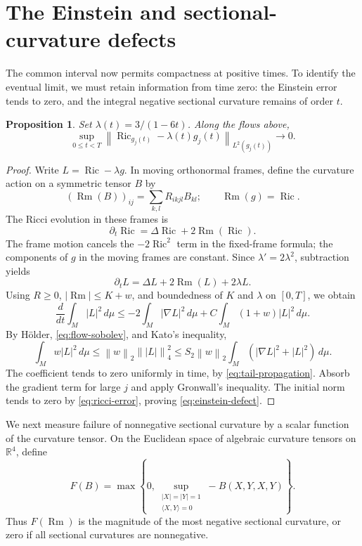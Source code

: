 \documentclass[11pt]{article}
\newtheorem{proposition}[theorem]{Proposition}
\theoremstyle{definition}
\theoremstyle{remark}
\numberwithin{equation}{section}
\DeclareMathOperator{\Ric}{Ric}
\DeclareMathOperator{\Rm}{Rm}
\newcommand{\dd}{\,d\mu}
\newcommand{\R}{\mathbb R}
\newcommand{\norm}[1]{\left\lVert #1\right\rVert}
\begin{document}
\section{The Einstein and sectional-curvature defects}
\label{sec:defects}

The common interval now permits compactness at positive times. To
identify the eventual limit, we must retain information from time zero:
the Einstein error tends to zero, and the integral negative sectional
curvature remains of order $t$.

\begin{proposition}\label{prop:einstein-defect}
Set $\lambda(t)=3/(1-6t)$. Along the flows above,
\begin{equation}\label{eq:einstein-defect}
 \sup_{0\le t<T}
 \norm{\Ric_{g_j(t)}-\lambda(t)g_j(t)}_{L^2(g_j(t))}
 \longrightarrow0.
\end{equation}
\end{proposition}

\begin{proof}
Write $L=\Ric-\lambda g$. In moving orthonormal frames, define the
curvature action on a symmetric tensor $B$ by
\[
 (\Rm(B))_{ij}=\sum_{k,l}R_{ikjl}B_{kl};
 \qquad \Rm(g)=\Ric.
\]
The Ricci evolution in these frames is
\[
 \partial_t\Ric=\Delta\Ric+2\Rm(\Ric).
\]
The frame motion cancels the $-2\Ric^2$ term in the fixed-frame formula;
the components of $g$ in the moving frames are constant. Since
$\lambda'=2\lambda^2$, subtraction yields
\begin{equation}\label{eq:L-flow}
 \partial_tL=\Delta L+2\Rm(L)+2\lambda L.
\end{equation}
Using $R\ge0$, $|\Rm|\le K+w$, and boundedness of $K$ and $\lambda$
on $[0,T]$, we obtain
\[
 \frac d{dt}\int_M|L|^2\dd
 \le-2\int_M|\nabla L|^2\dd
       +C\int_M(1+w)|L|^2\dd.
\]
By H\"older, \eqref{eq:flow-sobolev}, and Kato's inequality,
\[
 \int_Mw|L|^2\dd
 \le\norm w_2\norm{|L|}_4^2
 \le S_2\norm w_2\int_M(|\nabla L|^2+|L|^2)\dd.
\]
The coefficient tends to zero uniformly in time, by
\eqref{eq:tail-propagation}. Absorb the gradient term for large $j$
and apply Gronwall's inequality. The initial norm tends to zero by
\eqref{eq:ricci-error}, proving \eqref{eq:einstein-defect}.
\end{proof}

We next measure failure of nonnegative sectional curvature by a scalar
function of the curvature tensor. On the Euclidean space of algebraic
curvature tensors on $\R^4$, define
\begin{equation}\label{eq:F-definition}
 F(B)=\max\left\{0,
 \sup_{\substack{|X|=|Y|=1\\\langle X,Y\rangle=0}}
              -B(X,Y,X,Y)\right\}.
\end{equation}
Thus $F(\Rm)$ is the magnitude of the most negative sectional curvature,
or zero if all sectional curvatures are nonnegative.
\end{document}
